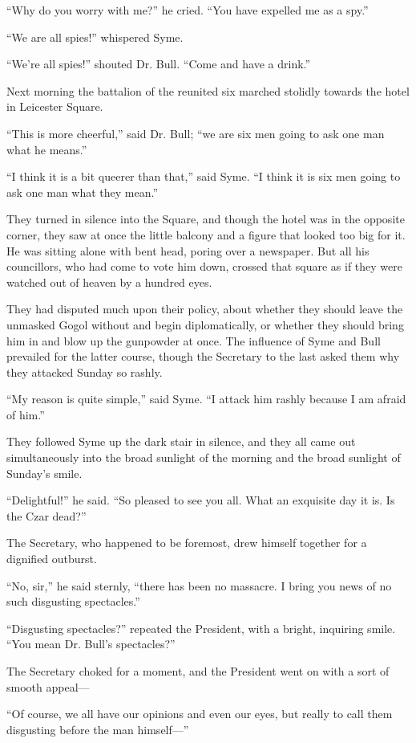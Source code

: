 \documentclass{book}
\begin{document}
“Why do you worry with me?” he cried. “You have expelled me as a spy.”

“We are all spies!” whispered Syme.

“We’re all spies!” shouted Dr. Bull. “Come and have a drink.”

Next morning the battalion of the reunited six marched stolidly towards the hotel in Leicester Square.

“This is more cheerful,” said Dr. Bull; “we are six men going to ask one man what he means.”

“I think it is a bit queerer than that,” said Syme. “I think it is six men going to ask one man what they mean.”

They turned in silence into the Square, and though the hotel was in the opposite corner, they saw at once the little balcony and a figure that looked too big for it. He was sitting alone with bent head, poring over a newspaper. But all his councillors, who had come to vote him down, crossed that square as if they were watched out of heaven by a hundred eyes.

They had disputed much upon their policy, about whether they should leave the unmasked Gogol without and begin diplomatically, or whether they should bring him in and blow up the gunpowder at once. The influence of Syme and Bull prevailed for the latter course, though the Secretary to the last asked them why they attacked Sunday so rashly.

“My reason is quite simple,” said Syme. “I attack him rashly because I am afraid of him.”

They followed Syme up the dark stair in silence, and they all came out simultaneously into the broad sunlight of the morning and the broad sunlight of Sunday’s smile.

“Delightful!” he said. “So pleased to see you all. What an exquisite day it is. Is the Czar dead?”

The Secretary, who happened to be foremost, drew himself together for a dignified outburst.

“No, sir,” he said sternly, “there has been no massacre. I bring you news of no such disgusting spectacles.”

“Disgusting spectacles?” repeated the President, with a bright, inquiring smile. “You mean Dr. Bull’s spectacles?”

The Secretary choked for a moment, and the President went on with a sort of smooth appeal—

“Of course, we all have our opinions and even our eyes, but really to call them disgusting before the man himself—”
\end{document}
